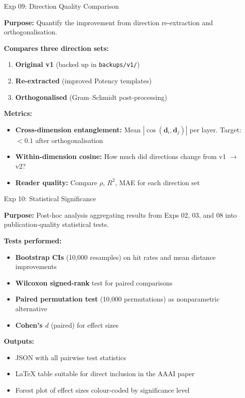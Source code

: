 \documentclass[aspectratio=169,11pt]{beamer}
\begin{document}
\begin{frame}{Exp 09: Direction Quality Comparison}

\textbf{Purpose:} Quantify the improvement from direction re-extraction
and orthogonalisation.

\bigskip

\textbf{Compares three direction sets:}
\begin{enumerate}
    \item \textbf{Original v1} (backed up in \texttt{backups/v1/})
    \item \textbf{Re-extracted} (improved Potency templates)
    \item \textbf{Orthogonalised} (Gram--Schmidt post-processing)
\end{enumerate}

\bigskip

\textbf{Metrics:}
\begin{itemize}
    \item \textbf{Cross-dimension entanglement:} Mean $|\cos(\mathbf{d}_i, \mathbf{d}_j)|$ per layer.
          Target: $< 0.1$ after orthogonalisation
    \item \textbf{Within-dimension cosine:} How much did directions change
          from v1 $\rightarrow$ v2?
    \item \textbf{Reader quality:} Compare $\rho$, $R^2$, MAE for each
          direction set
\end{itemize}
\end{frame}

\begin{frame}{Exp 10: Statistical Significance}

\textbf{Purpose:} Post-hoc analysis aggregating results from Exps 02, 03,
and 08 into publication-quality statistical tests.

\bigskip

\textbf{Tests performed:}
\begin{itemize}
    \item \textbf{Bootstrap CIs} (10{,}000 resamples) on hit rates and
          mean distance improvements
    \item \textbf{Wilcoxon signed-rank} test for paired comparisons
    \item \textbf{Paired permutation test} (10{,}000 permutations) as
          nonparametric alternative
    \item \textbf{Cohen's $d$} (paired) for effect sizes
\end{itemize}

\bigskip

\textbf{Outputs:}
\begin{itemize}
    \item JSON with all pairwise test statistics
    \item LaTeX table suitable for direct inclusion in the AAAI paper
    \item Forest plot of effect sizes colour-coded by significance level
\end{itemize}
\end{frame}
\end{document}

